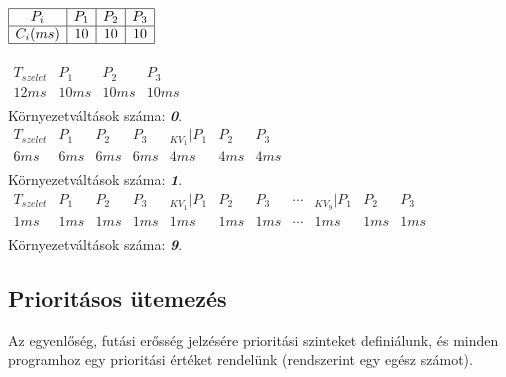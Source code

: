 \documentclass[tikz,12pt,margin=0px]{article}
\begin{document}
    {\small
    \noindent $\begin{array}{|c|c|c|c|}
                        \hline
                         P_{i} & P_{1} & P_{2} & P_{3}  \\ \hline
                         C_{i}(ms) & 10 & 10 & 10 \\ \hline
                       \end{array}$\\\\

      \noindent $\begin{array}{c||c|c|c}
        T_{szelet} & P_1 & P_2 & P_3  \\ \hline
        12 ms & 10 ms & 10 ms & 10 ms \\
      \end{array}$\\

    \noindent Környezetváltások száma: \emph{\textbf{0}}.\\

      \noindent $\begin{array}{c||c|c|c||c|c|c}
        T_{szelet} & P_1 & P_2 & P_3 & _{KV_1} | P_1 & P_2 & P_3  \\ \hline
        6 ms & 6 ms & 6 ms & 6 ms & 4 ms & 4 ms & 4 ms \\
      \end{array}$\\

    \noindent Környezetváltások száma: \emph{\textbf{1}}.\\

      \noindent $\begin{array}{c||c|c|c||c|c|c||c||c|c|c}
        T_{szelet} & P_1 & P_2 & P_3 &_{KV_1} | P_1 & P_2 & P_3 & \cdots & _{KV_9} | P_1 & P_2 & P_3  \\ \hline
        1 ms & 1 ms & 1 ms & 1 ms & 1 ms & 1 ms & 1 ms & \cdots & 1 ms & 1 ms & 1 ms \\
      \end{array}$\\

    \noindent Környezetváltások száma: \emph{\textbf{9}}.\\
    }

    \subsection*{Prioritásos ütemezés}

    Az egyenlőség, futási erősség jelzésére prioritási szinteket definiálunk, és minden programhoz egy prioritási értéket rendelünk (rendszerint egy egész számot).\\
\end{document}
